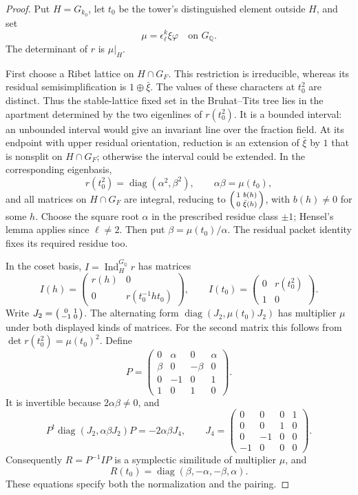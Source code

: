 \begin{proof}
Put \(H=G_{k_0}\), let \(t_0\) be the tower's distinguished
element outside \(H\), and set
\[
 \mu=\epsilon_\ell^k\xi\varphi
       \quad\text{on }G_{\mathbb Q}.
\]
The determinant of \(r\) is \(\mu|_H\).

First choose a Ribet lattice on \(H\cap G_F\).
This restriction is irreducible, whereas its residual
semisimplification is \(1\oplus\bar\xi\).
The values of these characters at \(t_0^2\) are distinct.
Thus the stable-lattice fixed set in the Bruhat--Tits tree lies
in the apartment determined by the two eigenlines of
\(r(t_0^2)\).
It is a bounded interval: an unbounded interval would give an
invariant line over the fraction field.
At its endpoint with upper residual orientation, reduction is
an extension of \(\bar\xi\) by \(1\) that is nonsplit on
\(H\cap G_F\); otherwise the interval could be extended.
In the corresponding eigenbasis,
\[
 r(t_0^2)=\operatorname{diag}(\alpha^2,\beta^2),\qquad
 \alpha\beta=\mu(t_0),
\]
and all matrices on \(H\cap G_F\) are integral, reducing to
\(\begin{psmallmatrix}1&b(h)\\0&\bar\xi(h)\end{psmallmatrix}\),
with \(b(h)\ne0\) for some \(h\).
Choose the square root \(\alpha\) in the prescribed residue
class \(\pm1\); Hensel's lemma applies since \(\ell\ne2\).
Then put \(\beta=\mu(t_0)/\alpha\).
The residual packet identity fixes its required residue too.

In the coset basis, \(I=\operatorname{Ind}_H^{G_{\mathbb Q}}r\)
has matrices
\[
 I(h)=
 \begin{pmatrix}r(h)&0\\0&r(t_0^{-1}ht_0)\end{pmatrix},
 \qquad
 I(t_0)=
 \begin{pmatrix}0&r(t_0^2)\\1&0\end{pmatrix}.
\]
Write \(J_2=\begin{psmallmatrix}0&1\\-1&0\end{psmallmatrix}\).
The alternating form
\(\operatorname{diag}(J_2,\mu(t_0)J_2)\) has multiplier
\(\mu\) under both displayed kinds of matrices.
For the second matrix this follows from
\(\det r(t_0^2)=\mu(t_0)^2\).
Define
\[
 P=
 \begin{pmatrix}
 0&\alpha&0&\alpha\\
 \beta&0&-\beta&0\\
 0&-1&0&1\\
 1&0&1&0
 \end{pmatrix}.
\]
It is invertible because \(2\alpha\beta\ne0\), and
\[
 P^t\operatorname{diag}(J_2,\alpha\beta J_2)P
       =-2\alpha\beta J_4,\qquad
 J_4=\begin{pmatrix}
 0&0&0&1\\0&0&1&0\\0&-1&0&0\\-1&0&0&0
 \end{pmatrix}.
\]
Consequently \(R=P^{-1}IP\) is a symplectic similitude of
multiplier \(\mu\), and
\[
 R(t_0)=\operatorname{diag}(\beta,-\alpha,-\beta,\alpha).
\]
These equations specify both the normalization and the pairing.


\end{proof}
